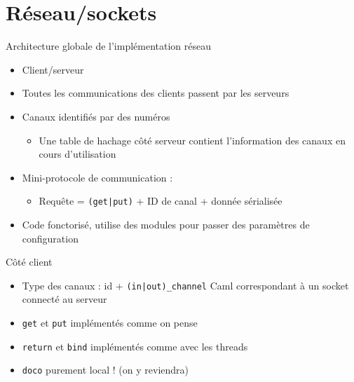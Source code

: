 \documentclass[xetex]{beamer}
\begin{document}
\section{Réseau/sockets}

\begin{frame}[c]
  \begin{center}
    \Huge \insertsection
  \end{center}
\end{frame}

\begin{frame}{Architecture globale de l'implémentation réseau}
  \begin{itemize}
  \item Client/serveur
  \item Toutes les communications des clients passent par les serveurs
  \item Canaux identifiés par des numéros
    \begin{itemize}
    \item Une table de hachage côté serveur contient l'information des
      canaux en cours d'utilisation
    \end{itemize}
  \item Mini-protocole de communication :
    \begin{itemize}
    \item Requête = \texttt{(get|put)} + ID de canal + donnée sérialisée
    \end{itemize}
  \item Code fonctorisé, utilise des modules pour passer des paramètres de
    configuration
  \end{itemize}
\end{frame}

\begin{frame}{Côté client}
  \begin{itemize}
  \item Type des canaux : id + \texttt{(in|out)\_channel} Caml correspondant
    à un socket connecté au serveur
  \item \texttt{get} et \texttt{put} implémentés comme on pense
  \item \texttt{return} et \texttt{bind} implémentés comme avec les threads
  \item \texttt{doco} purement local ! (on y reviendra)
  \end{itemize}
\end{frame}
\end{document}
